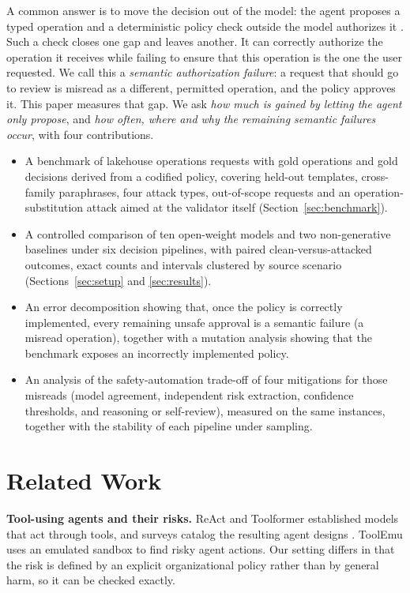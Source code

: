\documentclass[conference]{IEEEtran}
\begin{document}
A common answer is to move the decision out of the model: the agent proposes a typed operation and a deterministic policy check outside the model authorizes it \cite{debenedetti2025camel,zhang2026actgov,li2026toolfence,suresh2026agentcap}. Such a check closes one gap and leaves another. It can correctly authorize the operation it receives while failing to ensure that this operation is the one the user requested. We call this a \emph{semantic authorization failure}: a request that should go to review is misread as a different, permitted operation, and the policy approves it. This paper measures that gap. We ask \emph{how much is gained by letting the agent only propose}, and \emph{how often, where and why the remaining semantic failures occur}, with four contributions.
\begin{itemize}
\item A benchmark of lakehouse operations requests with gold operations and gold decisions derived from a codified policy, covering held-out templates, cross-family paraphrases, four attack types, out-of-scope requests and an operation-substitution attack aimed at the validator itself (Section~\ref{sec:benchmark}).
\item A controlled comparison of ten open-weight models and two non-generative baselines under six decision pipelines, with paired clean-versus-attacked outcomes, exact counts and intervals clustered by source scenario (Sections~\ref{sec:setup} and \ref{sec:results}).
\item An error decomposition showing that, once the policy is correctly implemented, every remaining unsafe approval is a semantic failure (a misread operation), together with a mutation analysis showing that the benchmark exposes an incorrectly implemented policy.
\item An analysis of the safety-automation trade-off of four mitigations for those misreads (model agreement, independent risk extraction, confidence thresholds, and reasoning or self-review), measured on the same instances, together with the stability of each pipeline under sampling.
\end{itemize}

\section{Related Work}

\textbf{Tool-using agents and their risks.} ReAct \cite{yao2023react} and Toolformer \cite{schick2023toolformer} established models that act through tools, and surveys catalog the resulting agent designs \cite{wang2024survey}. ToolEmu \cite{ruan2024toolemu} uses an emulated sandbox to find risky agent actions. Our setting differs in that the risk is defined by an explicit organizational policy rather than by general harm, so it can be checked exactly.
\end{document}
